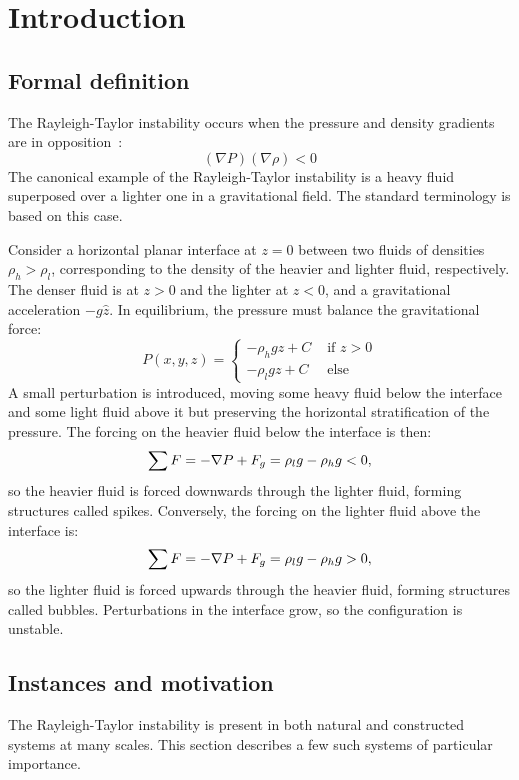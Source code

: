 \chapter{Introduction}

\section{Formal definition}
The Rayleigh-Taylor instability occurs when the pressure and density gradients are in opposition~\cite{Sharp1984}:
\begin{equation}
(\nabla P)(\nabla \rho) < 0
\end{equation}
The canonical example of the Rayleigh-Taylor instability is a heavy fluid superposed over a lighter one in a gravitational field.
The standard terminology is based on this case.

Consider a horizontal planar interface at $z=0$ between two fluids of densities $\rho_h > \rho_l$, corresponding to the density of the heavier and lighter fluid, respectively.
The denser fluid is at $z > 0$ and the lighter at $z < 0$, and a gravitational acceleration $-g \hat{z}$.
In equilibrium, the pressure must balance the gravitational force:
\begin{equation}
P(x,y,z) = \begin{cases}- \rho_h g z + C& \text{ if } z > 0 \\
                        - \rho_l g z + C& \text{ else}
           \end{cases}
\end{equation}
A small perturbation is introduced, moving some heavy fluid below the interface and some light fluid above it but preserving the horizontal stratification of the pressure.
The forcing on the heavier fluid below the interface is then:
\begin{equation}\elabel{force1}
\sum F = - \nabla P + F_g = \rho_l g  - \rho_h g < 0,
\end{equation}
so the heavier fluid is forced downwards through the lighter fluid, forming structures called spikes.
Conversely, the forcing on the lighter fluid above the interface is:
\begin{equation} \elabel{force2}
\sum F = - \nabla P + F_g = \rho_l g  - \rho_h g > 0,
\end{equation}
so the lighter fluid is forced upwards through the heavier fluid, forming structures called bubbles.
Perturbations in the interface grow, so the configuration is unstable.

\section{Instances and motivation}
The Rayleigh-Taylor instability is present in both natural and constructed systems at many scales.
This section describes a few such systems of particular importance.

